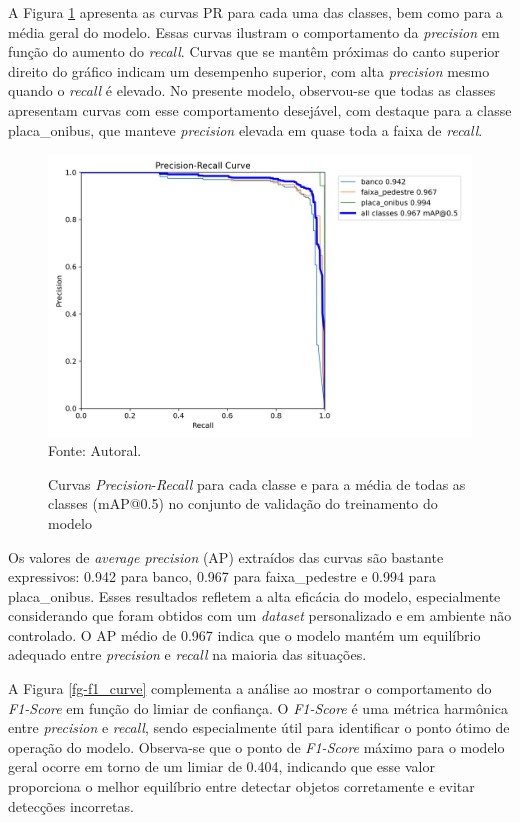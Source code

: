 A Figura \ref{fg-pr_curve} apresenta as curvas PR para cada uma das classes, bem como para a média geral do modelo. Essas curvas ilustram o comportamento da \textit{precision} em função do aumento do \textit{recall}. Curvas que se mantêm próximas do canto superior direito do gráfico indicam um desempenho superior, com alta \textit{precision} mesmo quando o \textit{recall} é elevado. No presente modelo, observou-se que todas as classes apresentam curvas com esse comportamento desejável, com destaque para a classe placa\_onibus, que manteve \textit{precision} elevada em quase toda a faixa de \textit{recall}.

\begin{figure}[htbp]
  \centering
  \caption{Curvas \textit{Precision}-\textit{Recall} para cada classe e para a média de todas as classes (mAP@0.5) no conjunto de validação do treinamento do modelo}
  \includegraphics[width=1\textwidth]{Figuras/PR_curve.png}
  \\
  Fonte: Autoral.
  \label{fg-pr_curve}
\end{figure}

Os valores de \textit{average precision} (AP) extraídos das curvas são bastante expressivos: 0.942 para banco, 0.967 para faixa\_pedestre e 0.994 para placa\_onibus. Esses resultados refletem a alta eficácia do modelo, especialmente considerando que foram obtidos com um \textit{dataset} personalizado e em ambiente não controlado. O AP médio de 0.967 indica que o modelo mantém um equilíbrio adequado entre \textit{precision} e \textit{recall} na maioria das situações.

A Figura \ref{fg-f1_curve} complementa a análise ao mostrar o comportamento do \textit{F1-Score} em função do limiar de confiança. O \textit{F1-Score} é uma métrica harmônica entre \textit{precision} e \textit{recall}, sendo especialmente útil para identificar o ponto ótimo de operação do modelo. Observa-se que o ponto de \textit{F1-Score} máximo para o modelo geral ocorre em torno de um limiar de 0.404, indicando que esse valor proporciona o melhor equilíbrio entre detectar objetos corretamente e evitar detecções incorretas.

